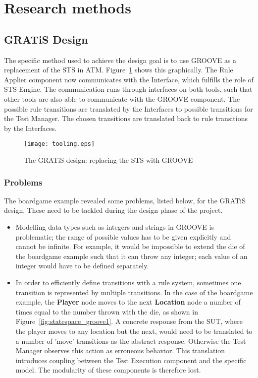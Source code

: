 \section{Research methods}\label{sec:research_methods}

\subsection{GRATiS Design}
The specific method used to achieve the design goal is to use GROOVE as a replacement of the STS in ATM. Figure~\ref{fig:tooling} shows this graphically. The Rule Applier component now communicates with the Interface, which fulfills the role of STS Engine. The communication runs through interfaces on both tools, such that other tools are also able to communicate with the GROOVE component. The possible rule transitions are translated by the Interfaces to possible transitions for the Test Manager. The chosen transitions are translated back to rule transitions by the Interfaces.

\begin{figure}[h]
  \begin{center}
    \texttt{[image: tooling.eps]}
  \end{center}
  \caption{The GRATiS design: replacing the STS with GROOVE}
  \label{fig:tooling}
\end{figure}

\subsubsection{Problems}\label{sec:problems}
The boardgame example revealed some problems, listed below, for the GRATiS design. These need to be tackled during the design phase of the project. 
\begin{itemize}
  \item Modelling data types such as integers and strings in GROOVE is problematic; the range of possible values has to be given explicitly and cannot be infinite. For example, it would be impossible to extend the die of the boardgame example such that it can throw any integer; each value of an integer would have to be defined separately.
  \item In order to efficiently define transitions with a rule system, sometimes one transition is represented by multiple transitions. In the case of the boardgame example, the \textbf{Player} node moves to the next \textbf{Location} node a number of times equal to the number thrown with the die, as shown in Figure~\ref{fig:statespace_groove1}. A concrete response from the SUT, where the player moves to any location but the next, would need to be translated to a number of 'move' transitions as the abstract response. Otherwise the Test Manager observes this action as erroneous behavior. This translation introduces coupling between the Test Execution component and the specific model. The modularity of these components is therefore lost. %
\end{itemize}

